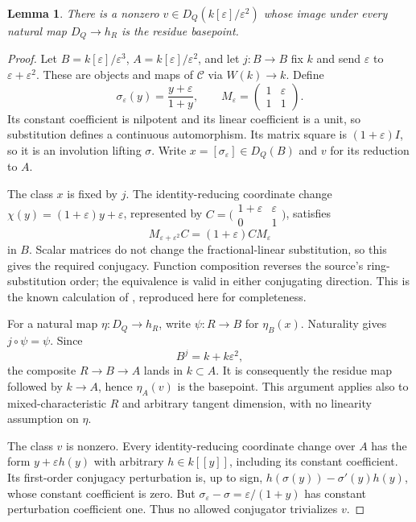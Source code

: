 \documentclass[11pt]{article}
\newtheorem{lemma}[theorem]{Lemma}
\newcommand{\eps}{\varepsilon}
\begin{document}
\begin{lemma}\label{lem:recipient}
There is a nonzero $v\in D_Q(k[\eps]/\eps^2)$ whose image under every natural
map $D_Q\to h_R$ is the residue basepoint.
\end{lemma}
\begin{proof}
Let $B=k[\eps]/\eps^3$, $A=k[\eps]/\eps^2$, and let $j:B\to B$ fix $k$ and
send $\eps$ to $\eps+\eps^2$. These are objects and maps of $\mathcal C$ via
$W(k)\to k$. Define
\[
 \sigma_\eps(y)=\frac{y+\eps}{1+y},\qquad
 M_\eps=\begin{pmatrix}1&\eps\\1&1\end{pmatrix}.
\]
Its constant coefficient is nilpotent and its linear coefficient is a unit,
so substitution defines a continuous automorphism. Its matrix square is
$(1+\eps)I$, so it is an involution lifting $\sigma$.
Write $x=[\sigma_\eps]\in D_Q(B)$ and $v$ for its reduction to $A$.

The class $x$ is fixed by $j$. The identity-reducing coordinate change
$\chi(y)=(1+\eps)y+\eps$, represented by
$C=\bigl(\begin{smallmatrix}1+\eps&\eps\\0&1\end{smallmatrix}\bigr)$, satisfies
\[
 M_{\eps+\eps^2}C=(1+\eps)CM_\eps
\]
in $B$. Scalar matrices do not change the fractional-linear substitution,
so this gives the required conjugacy. Function composition reverses the
source's ring-substitution order; the equivalence is valid in either
conjugating direction. This is the known calculation of
\cite[Proposition~4.1]{BC}, reproduced here for completeness.

For a natural map $\eta:D_Q\to h_R$, write $\psi:R\to B$ for $\eta_B(x)$.
Naturality gives $j\circ\psi=\psi$. Since
\[
 B^j=k+k\eps^2,
\]
the composite $R\to B\to A$ lands in $k\subset A$. It is consequently the
residue map followed by $k\to A$, hence $\eta_A(v)$ is the basepoint. This
argument applies also to mixed-characteristic $R$ and arbitrary tangent
dimension, with no linearity assumption on $\eta$.

The class $v$ is nonzero. Every identity-reducing coordinate change over $A$
has the form $y+\eps h(y)$ with arbitrary $h\in k[[y]]$, including its
constant coefficient. Its first-order conjugacy perturbation is, up to sign,
$h(\sigma(y))-\sigma'(y)h(y)$, whose constant coefficient is zero.
But $\sigma_\eps-\sigma=\eps/(1+y)$ has constant perturbation coefficient
one. Thus no allowed conjugator trivializes $v$.
\end{proof}
\end{document}
